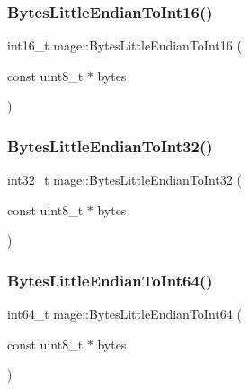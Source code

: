 \subsubsection{\texorpdfstring{Bytes\+Little\+Endian\+To\+Int16()}{BytesLittleEndianToInt16()}}
{\footnotesize\ttfamily int16\+\_\+t mage\+::\+Bytes\+Little\+Endian\+To\+Int16 (\begin{DoxyParamCaption}\item[{const uint8\+\_\+t $\ast$}]{bytes }\end{DoxyParamCaption})}

\hypertarget{namespacemage_ad3cd4209c8a542d2196091a4753a58b3}{}\label{namespacemage_ad3cd4209c8a542d2196091a4753a58b3} 
\subsubsection{\texorpdfstring{Bytes\+Little\+Endian\+To\+Int32()}{BytesLittleEndianToInt32()}}
{\footnotesize\ttfamily int32\+\_\+t mage\+::\+Bytes\+Little\+Endian\+To\+Int32 (\begin{DoxyParamCaption}\item[{const uint8\+\_\+t $\ast$}]{bytes }\end{DoxyParamCaption})}

\hypertarget{namespacemage_ae242f13f851ffa9c73bdcb17902f6b57}{}\label{namespacemage_ae242f13f851ffa9c73bdcb17902f6b57} 
\subsubsection{\texorpdfstring{Bytes\+Little\+Endian\+To\+Int64()}{BytesLittleEndianToInt64()}}
{\footnotesize\ttfamily int64\+\_\+t mage\+::\+Bytes\+Little\+Endian\+To\+Int64 (\begin{DoxyParamCaption}\item[{const uint8\+\_\+t $\ast$}]{bytes }\end{DoxyParamCaption})}

\hypertarget{namespacemage_a083a2ea889a770925db23c1f514454d9}{}\label{namespacemage_a083a2ea889a770925db23c1f514454d9} 
